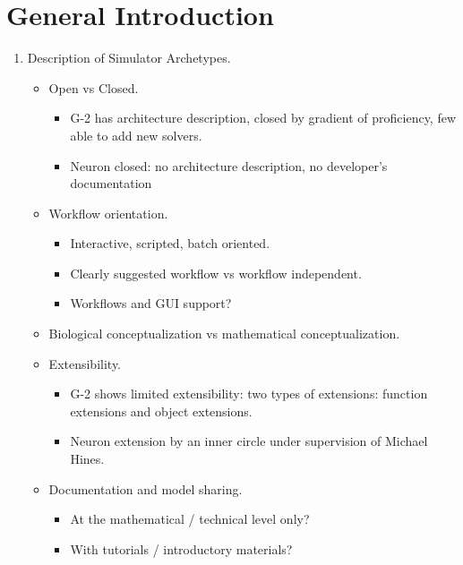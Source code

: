 \documentclass[12pt]{article}
\begin{document}


\section{General Introduction}

\begin{enumerate}
\item Description of Simulator Archetypes.
  \begin{itemize}
  \item Open vs Closed.
    \begin{itemize}
    \item G-2 has architecture description, closed by gradient of
      proficiency, few able to add new solvers.
    \item Neuron closed: no architecture description, no developer's
      documentation
    \end{itemize}
  \item Workflow orientation.
    \begin{itemize}
    \item Interactive, scripted, batch oriented.
    \item Clearly suggested workflow vs workflow independent.
    \item Workflows and GUI support?
    \end{itemize}
  \item Biological conceptualization vs mathematical
    conceptualization.
  \item Extensibility.
    \begin{itemize}
    \item G-2 shows limited extensibility: two types of extensions:
      function extensions and object extensions.
    \item Neuron extension by an inner circle under supervision of
      Michael Hines.
    \end{itemize}
  \item Documentation and model sharing.
    \begin{itemize}
    \item At the mathematical / technical level only?
    \item With tutorials / introductory materials?

\end{itemize}
\end{itemize}
\end{enumerate}
\end{document}
